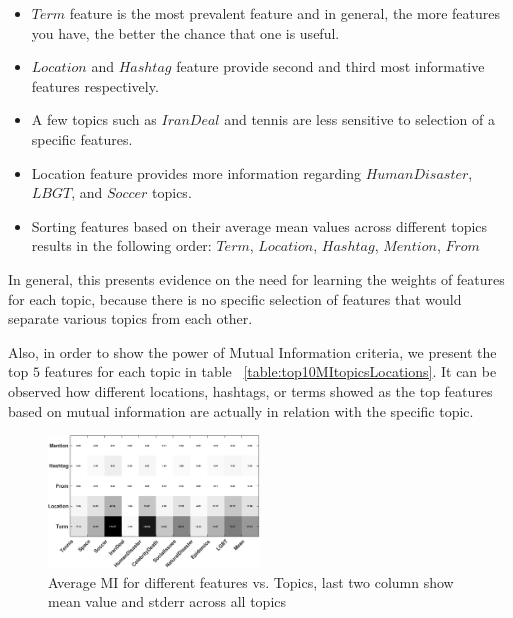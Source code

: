 \begin{itemize}
\item $Term$ feature is the most prevalent feature and in general, the more features you have, the better the chance that one is useful.
\item $Location$ and $Hashtag$ feature provide second and third most informative features respectively.
\item A few topics such as $IranDeal$ and tennis are less sensitive to selection of a specific features.
\item Location feature provides more information regarding $HumanDisaster$, $LBGT$, and $Soccer$ topics.
\item Sorting features based on their average mean values across different topics results in the following order: $Term$, $Location$, $Hashtag$, $Mention$, $From$
\end{itemize}

In general, this presents evidence on the need for learning the weights of features for each topic, because there is no specific selection of features that would separate various topics from each other.

Also, in order to show the power of Mutual Information criteria, we present the top $5$ features for each topic in table ~\ref{table:top10MItopicsLocations}. It can be observed how different locations, hashtags, or terms showed as the top features based on mutual information are actually in relation with the specific topic.

\begin{figure}[h!]
\centering
\includegraphics[width=0.5\textwidth]{images/avgMI_gray.pdf}
\vspace{-3mm}
\caption{Average MI for different features vs. Topics, last two column show mean value and stderr across all topics}
\label{fig:avgMI}
\end{figure}

